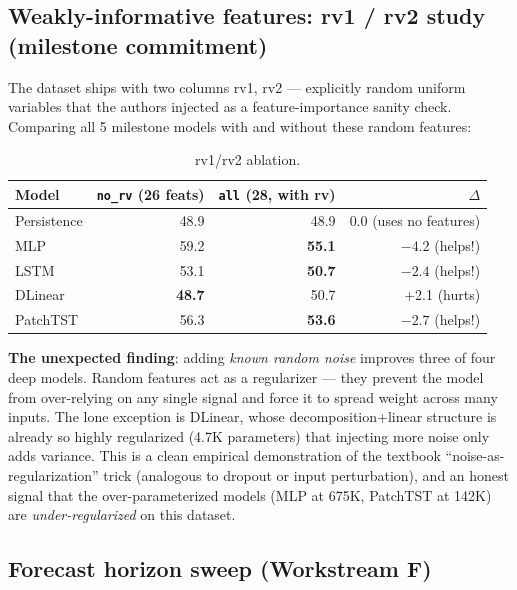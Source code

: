 \documentclass[11pt,letterpaper]{article}
\begin{document}
\subsection{Weakly-informative features: rv1 / rv2 study (milestone commitment)}

The dataset ships with two columns rv1, rv2 --- explicitly random uniform
variables that the authors injected as a feature-importance sanity check.
Comparing all 5 milestone models with and without these random features:

\begin{table}[H]
\centering
\small
\begin{tabular}{lrrr}
\toprule
\textbf{Model} & \textbf{\texttt{no\_rv} (26 feats)} & \textbf{\texttt{all} (28, with rv)} & \textbf{$\Delta$} \\
\midrule
Persistence & 48.9          & 48.9           & 0.0 (uses no features) \\
MLP         & 59.2          & \textbf{55.1}  & $\mathbf{-4.2}$ (helps!) \\
LSTM        & 53.1          & \textbf{50.7}  & $\mathbf{-2.4}$ (helps!) \\
DLinear     & \textbf{48.7} & 50.7           & +2.1 (hurts)            \\
PatchTST    & 56.3          & \textbf{53.6}  & $\mathbf{-2.7}$ (helps!) \\
\bottomrule
\end{tabular}
\caption{rv1/rv2 ablation.}
\end{table}

\textbf{The unexpected finding}: adding \emph{known random noise} improves
three of four deep models. Random features act as a regularizer --- they
prevent the model from over-relying on any single signal and force it to
spread weight across many inputs. The lone exception is DLinear, whose
decomposition+linear structure is already so highly regularized (4.7K
parameters) that injecting more noise only adds variance. This is a clean
empirical demonstration of the textbook ``noise-as-regularization'' trick
(analogous to dropout or input perturbation), and an honest signal that
the over-parameterized models (MLP at 675K, PatchTST at 142K) are
\emph{under-regularized} on this dataset.

\subsection{Forecast horizon sweep (Workstream F)}
\end{document}
